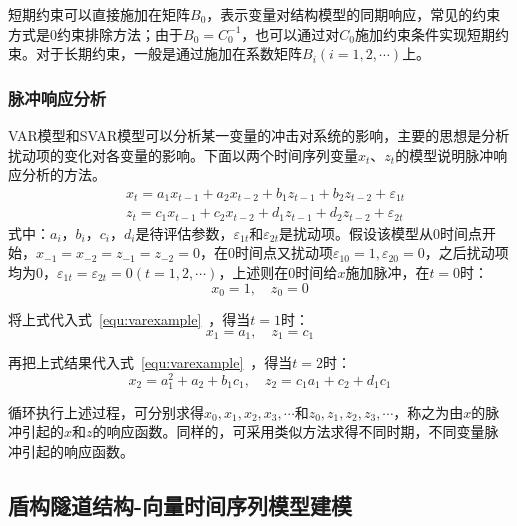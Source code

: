 短期约束可以直接施加在矩阵$B_0$，表示变量对结构模型的同期响应，常见的约束方式是0约束排除方法；由于$B_0=C_0^{-1}$，也可以通过对$C_0$施加约束条件实现短期约束。对于长期约束，一般是通过施加在系数矩阵$B_i(i=1,2,\cdots )$上。

\subsubsection{脉冲响应分析}

VAR模型和SVAR模型可以分析某一变量的冲击对系统的影响，主要的思想是分析扰动项的变化对各变量的影响。下面以两个时间序列变量$x_t$、$z_t$的模型说明脉冲响应分析的方法。
\begin{align}
  \label{equ:varexample}
  & {{x}_{t}}={{a}_{1}}{{x}_{t-1}}+{{a}_{2}}{{x}_{t-2}}+{{b}_{1}}{{z}_{t-1}}+{{b}_{2}}{{z}_{t-2}}+{{\varepsilon }_{1t}} \\ 
 & {{z}_{t}}={{c}_{1}}{{x}_{t-1}}+{{c}_{2}}{{x}_{t-2}}+{{d}_{1}}{{z}_{t-1}}+{{d}_{2}}{{z}_{t-2}}+{{\varepsilon }_{2t}} \nonumber
\end{align}
式中：$a_i$，$b_i$，$c_i$，$d_i$是待评估参数，${\varepsilon }_{1t}$和${\varepsilon }_{2t}$是扰动项。假设该模型从0时间点开始，$x_{-1}=x_{-2}=z_{-1}=z_{-2}=0$，在0时间点又扰动项${\varepsilon }_{10}=1,{\varepsilon }_{20}=0$，之后扰动项均为0，${\varepsilon }_{1t}={\varepsilon }_{2t}=0(t=1,2,\cdots )$，上述则在0时间给$x$施加脉冲，在$t=0$时：
\begin{equation}
	x_0=1,\quad z_0=0 \nonumber
\end{equation}

将上式代入式~\ref{equ:varexample}~，得当$t=1$时：
\begin{equation}
	x_1=a_1,\quad z_1=c_1 \nonumber
\end{equation}

再把上式结果代入式~\ref{equ:varexample}~，得当$t=2$时：
\begin{equation}
	x_2=a_1^2+a_2+b_1c_1,\quad z_2=c_1a_1+c_2+d_1c_1 \nonumber
\end{equation}

循环执行上述过程，可分别求得$x_0,x_1,x_2,x_3,\cdots $和$z_0,z_1,z_2,z_3,\cdots $，称之为由$x$的脉冲引起的$x$和$z$的响应函数。同样的，可采用类似方法求得不同时期，不同变量脉冲引起的响应函数。

\subsection{盾构隧道结构-向量时间序列模型建模}

